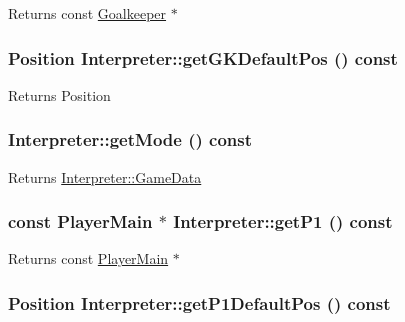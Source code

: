 \label{classInterpreter_ac086d0ece936720419817ec19ebc3d8d}
\begin{DoxyReturn}{Returns}
const \hyperlink{classGoalkeeper}{Goalkeeper} $\ast$ 
\end{DoxyReturn}
\hypertarget{classInterpreter_aa8430187c89dffc8a9290d48ddd82346}{
\subsubsection[{getGKDefaultPos}]{\setlength{\rightskip}{0pt plus 5cm}Position Interpreter::getGKDefaultPos () const}}
\label{classInterpreter_aa8430187c89dffc8a9290d48ddd82346}
\begin{DoxyReturn}{Returns}
Position 
\end{DoxyReturn}
\hypertarget{classInterpreter_adc77ada1a3d69c5e6bdfb2f1cc1a2e75}{
\subsubsection[{getMode}]{ Interpreter::getMode () const}}
\label{classInterpreter_adc77ada1a3d69c5e6bdfb2f1cc1a2e75}
\begin{DoxyReturn}{Returns}
\hyperlink{structInterpreter_1_1GameData}{Interpreter::GameData} 
\end{DoxyReturn}
\hypertarget{classInterpreter_af0d9f49ed686092925b626d032b0d9a6}{
\subsubsection[{getP1}]{\setlength{\rightskip}{0pt plus 5cm}const {\bf PlayerMain} $\ast$ Interpreter::getP1 () const}}
\label{classInterpreter_af0d9f49ed686092925b626d032b0d9a6}
\begin{DoxyReturn}{Returns}
const \hyperlink{classPlayerMain}{PlayerMain} $\ast$ 
\end{DoxyReturn}
\hypertarget{classInterpreter_a2b46c460756f87d2dcef4ea8d8d49aaa}{
\subsubsection[{getP1DefaultPos}]{\setlength{\rightskip}{0pt plus 5cm}Position Interpreter::getP1DefaultPos () const}}
